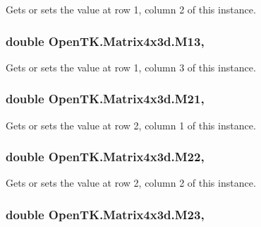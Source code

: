 Gets or sets the value at row 1, column 2 of this instance. 

\hypertarget{struct_open_t_k_1_1_matrix4x3d_a41a83bae71564500f7eab8a24eccdd69}{
\subsubsection[{M13}]{\setlength{\rightskip}{0pt plus 5cm}double Open\-T\-K.\-Matrix4x3d.\-M13\hspace{0.3cm}{\ttfamily [get]}, {\ttfamily [set]}}}\label{struct_open_t_k_1_1_matrix4x3d_a41a83bae71564500f7eab8a24eccdd69}


Gets or sets the value at row 1, column 3 of this instance. 

\hypertarget{struct_open_t_k_1_1_matrix4x3d_ab69f30f9adac2fd754b6342d7db12f73}{
\subsubsection[{M21}]{\setlength{\rightskip}{0pt plus 5cm}double Open\-T\-K.\-Matrix4x3d.\-M21\hspace{0.3cm}{\ttfamily [get]}, {\ttfamily [set]}}}\label{struct_open_t_k_1_1_matrix4x3d_ab69f30f9adac2fd754b6342d7db12f73}


Gets or sets the value at row 2, column 1 of this instance. 

\hypertarget{struct_open_t_k_1_1_matrix4x3d_a6fba10110c0e4393ee55ba2b055d0cde}{
\subsubsection[{M22}]{\setlength{\rightskip}{0pt plus 5cm}double Open\-T\-K.\-Matrix4x3d.\-M22\hspace{0.3cm}{\ttfamily [get]}, {\ttfamily [set]}}}\label{struct_open_t_k_1_1_matrix4x3d_a6fba10110c0e4393ee55ba2b055d0cde}


Gets or sets the value at row 2, column 2 of this instance. 

\hypertarget{struct_open_t_k_1_1_matrix4x3d_a617c1df8f6f5915a6eb4174e5e4f4494}{
\subsubsection[{M23}]{\setlength{\rightskip}{0pt plus 5cm}double Open\-T\-K.\-Matrix4x3d.\-M23\hspace{0.3cm}{\ttfamily [get]}, {\ttfamily [set]}}}\label{struct_open_t_k_1_1_matrix4x3d_a617c1df8f6f5915a6eb4174e5e4f4494}


